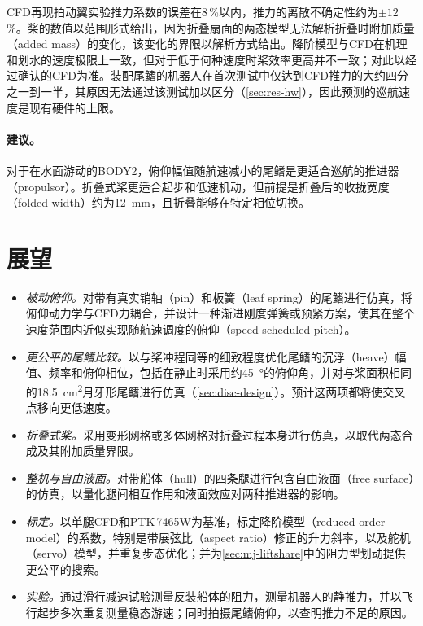 CFD再现拍动翼实验推力系数的误差在8\,\%以内，推力的离散不确定性约为$\pm12$\,\%。桨的数值以范围形式给出，因为折叠扇面的两态模型无法解析折叠时附加质量（added mass）的变化，该变化的界限以解析方式给出。降阶模型与CFD在机理和划水的速度极限上一致，但对于低于何种速度时桨效率更高并不一致；对此以经过确认的CFD为准。装配尾鳍的机器人在首次测试中仅达到CFD推力的大约四分之一到一半，其原因无法通过该测试加以区分（\cref{sec:res-hw}），因此预测的巡航速度是现有硬件的上限。

\paragraph{建议。}对于在水面游动的BODY2，俯仰幅值随航速减小的尾鳍是更适合巡航的推进器（propulsor）。折叠式桨更适合起步和低速机动，但前提是折叠后的收拢宽度（folded width）约为\SI{12}{\milli\metre}，且折叠能够在特定相位切换。

\section{展望}

\begin{itemize}
  \item \emph{被动俯仰。}对带有真实销轴（pin）和板簧（leaf spring）的尾鳍进行仿真，将俯仰动力学与CFD力耦合，并设计一种渐进刚度弹簧或预紧方案，使其在整个速度范围内近似实现随航速调度的俯仰（speed-scheduled pitch）。
  \item \emph{更公平的尾鳍比较。}以与桨冲程同等的细致程度优化尾鳍的沉浮（heave）幅值、频率和俯仰相位，包括在静止时采用约\SI{45}{\degree}的俯仰角，并对与桨面积相同的\SI{18.5}{\square\centi\metre}月牙形尾鳍进行仿真（\cref{sec:disc-design}）。预计这两项都将使交叉点移向更低速度。
  \item \emph{折叠式桨。}采用变形网格或多体网格对折叠过程本身进行仿真，以取代两态合成及其附加质量界限。
  \item \emph{整机与自由液面。}对带船体（hull）的四条腿进行包含自由液面（free surface）的仿真，以量化腿间相互作用和液面效应对两种推进器的影响。
  \item \emph{标定。}以单腿CFD和PTK\,7465W为基准，标定降阶模型（reduced-order model）的系数，特别是带展弦比（aspect ratio）修正的升力斜率，以及舵机（servo）模型，并重复步态优化；并为\cref{sec:mj-liftshare}中的阻力型划动提供更公平的搜索。
  \item \emph{实验。}通过滑行减速试验测量反装船体的阻力，测量机器人的静推力，并以飞行起步多次重复测量稳态游速；同时拍摄尾鳍俯仰，以查明推力不足的原因。
\end{itemize}
